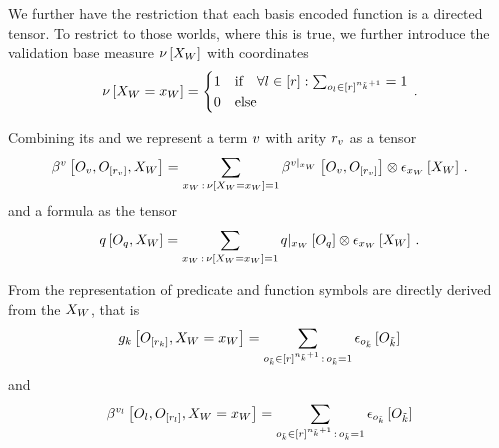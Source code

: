 We further have the restriction that each basis encoded function is a directed tensor.
To restrict to those worlds, where this is true, we further introduce the validation base measure $\nu\left[X_{W}\right]$ with coordinates
\begin{align*}
    \nu\left[X_{W}=x_{W}\right] =
    \begin{cases}
        1 & \text{if}\quad \forall{l\in[r]}:{\sum_{o_{l}\in[r]^{n_{\tilde{k}}+1}}=1} \\
        0 & \text{else}
    \end{cases} \, .
\end{align*}


Combining its \substitutionStructure{} and \semanticStructure{} we represent a \firstOrderLogic{} term $v$ with arity $r_{v}$ as a tensor
\begin{align*}
    \beta^{v}\left[O_{v},O_{[r_{v}]},X_{W}\right] =
    \sum_{x_{W}\,:\,\nu\left[X_{W}=x_{W}\right]=1}
    \beta^{{v}|_{x_{W}}}\left[O_{v},O_{[r_{v}]}\right]
    \otimes \epsilon_{x_{W}}\left[X_{W}\right] \, .
\end{align*}
and a formula as the tensor
\begin{align*}
    q\left[O_{q},X_{W}\right] =
    \sum_{x_{W}\,:\,\nu\left[X_{W}=x_{W}\right]=1} {q}|_{x_{W}} \left[O_{q}\right]
    \otimes \epsilon_{x_{W}}\left[X_{W}\right] \, .
\end{align*}

From  the representation of predicate and function symbols are directly derived from the $X_{W}$, that is
\begin{align*}
    g_{k}\left[O_{[r_{k}]},X_{W}=x_{W}\right]
    = \sum_{o_{\tilde{k}}\in[r]^{n_{\tilde{k}}+1}\,:\,o_{\tilde{k}}=1}
    \epsilon_{o_{\tilde{k}}}\left[O_{\tilde{k}}\right]
\end{align*}
and
\begin{align*}
    \beta^{v_{l}}\left[O_{l},O_{[r_{l}]},X_{W}=x_{W}\right]
    = \sum_{o_{\tilde{k}}\in[r]^{n_{\tilde{k}}+1}\,:\,o_{\tilde{k}}=1} \epsilon_{o_{\tilde{k}}}\left[O_{\tilde{k}}\right]
\end{align*}


